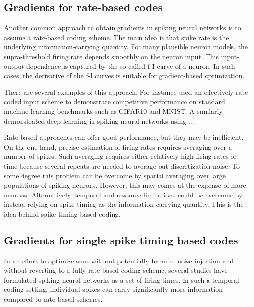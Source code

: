 \documentclass[journal,onecolumn,11pt]{IEEEtran}
\begin{document}
\subsection{Gradients for rate-based codes}

Another common approach to obtain gradients in spiking neural networks is to
assume a rate-based coding scheme.
The main idea is that spike rate is the underlying information-carrying quantity.
For many plausible neuron models, the supra-threshold firing rate depends
smoothly on the neuron input. This input-output dependence is captured by the
so-called f-I curve of a neuron.
In such cases, the derivative of the f-I curves is suitable for gradient-based optimization. 


There are several examples of this approach. 
For instance \citet{Hunsberger_Eliasmith15_spikdeep} used an effectively
rate-coded input scheme to demonstrate competitive performance on standard
machine learning benchmarks such as CIFAR10 and MNIST.
A similarly \cite{Lee_etal16_traideep} demonstrated deep learning in spiking
neural networks using ... %

Rate-based approaches can offer good performance, but they may be inefficient.
On the one hand, precise estimation of firing rates requires averaging over
a number of spikes.  Such averaging requires either relatively high firing rates or
time because several repeats are needed to average out discretization noise.  
To some degree this problem can be overcome by spatial averaging over
large populations of spiking neurons. However, this may comes at the expense of
more neurons. 
Alternatively, temporal and resource limitations could be overcome by instead relying on
spike timing as the information-carrying quantity. This is the idea behind
spike timing based coding.


\subsection{Gradients for single spike timing based codes}

In an effort to optimize \glspl{snn} without potentially harmful noise
injection and without reverting to a fully rate-based coding scheme, 
several studies have formulated spiking neural
networks as a set of firing times.
In such a temporal coding setting, individual spikes can carry significantly more
information compared to rate-based schemes.
\end{document}
